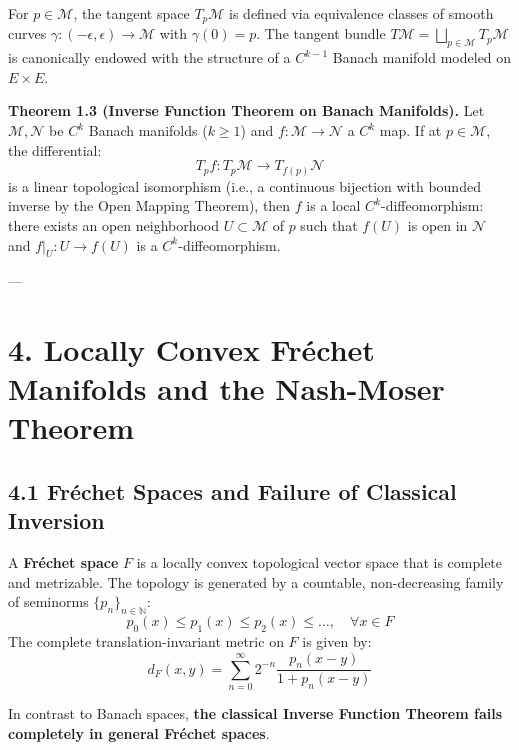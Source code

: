 \documentclass[11pt,twoside,openright]{amsbook}
\begin{document}
For $p \in \mathcal{M}$, the tangent space $T_p \mathcal{M}$ is defined via equivalence classes of smooth curves $\gamma: (-\epsilon, \epsilon) \to \mathcal{M}$ with $\gamma(0) = p$. The tangent bundle $T\mathcal{M} = \bigsqcup_{p \in \mathcal{M}} T_p \mathcal{M}$ is canonically endowed with the structure of a $C^{k-1}$ Banach manifold modeled on $E \times E$.

\textbf{Theorem 1.3 (Inverse Function Theorem on Banach Manifolds).} Let $\mathcal{M}, \mathcal{N}$ be $C^k$ Banach manifolds ($k \geq 1$) and $f: \mathcal{M} \to \mathcal{N}$ a $C^k$ map. If at $p \in \mathcal{M}$, the differential:
$$T_p f: T_p \mathcal{M} \longrightarrow T_{f(p)} \mathcal{N}$$
is a linear topological isomorphism (i.e., a continuous bijection with bounded inverse by the Open Mapping Theorem), then $f$ is a local $C^k$-diffeomorphism: there exists an open neighborhood $U \subset \mathcal{M}$ of $p$ such that $f(U)$ is open in $\mathcal{N}$ and $f|_U: U \to f(U)$ is a $C^k$-diffeomorphism.

---

\section{4. Locally Convex Fréchet Manifolds and the Nash-Moser Theorem}

\subsection{4.1 Fréchet Spaces and Failure of Classical Inversion}
A \textbf{Fréchet space} $F$ is a locally convex topological vector space that is complete and metrizable. The topology is generated by a countable, non-decreasing family of seminorms $\{p_n\}_{n \in \mathbb{N}}$:
$$p_0(x) \leq p_1(x) \leq p_2(x) \leq \dots, \quad \forall x \in F$$
The complete translation-invariant metric on $F$ is given by:
$$d_F(x, y) = \sum_{n=0}^\infty 2^{-n} \frac{p_n(x - y)}{1 + p_n(x - y)}$$

In contrast to Banach spaces, \textbf{the classical Inverse Function Theorem fails completely in general Fréchet spaces}. 
\end{document}

